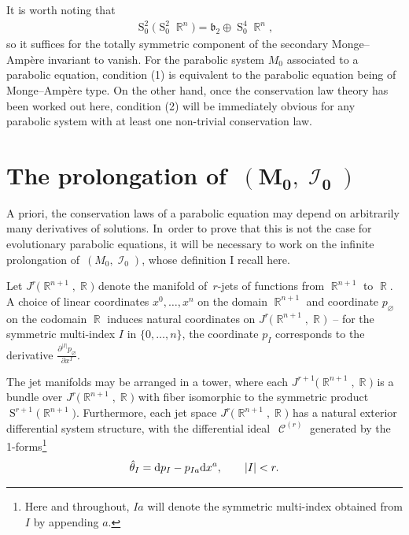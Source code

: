 \documentclass[pdftex]{sigma}
\DeclareMathOperator{\R}{\mathbb{R}}
\DeclareMathOperator{\Sym}{S}
\DeclareMathOperator{\I}{\mathcal{I}}
\DeclareMathOperator{\contact}{\mathcal{C}}
\renewcommand{\d}{{\rm d}}
\newcommand{\jet}[1]{J^{#1}\big(\R^{n+1},\R\big)}
\numberwithin{equation}{section}
\begin{document}
It is worth noting that
\begin{gather*}
\Sym^2_0 \big( \Sym^2_0 \R^n\big) = \mathfrak{b}_2 \oplus \Sym_0^4 \R^n ,
\end{gather*}
so it suffices for the totally symmetric component of the secondary Monge--Amp\`ere invariant to vanish.
For the parabolic system $M_0$ associated to a parabolic equation, condition (1) is equivalent to the parabolic equation being of Monge--Amp\`ere type. On the other hand, once the conservation law theory has been worked out here, condition (2) will be immediately obvious for any parabolic system with at least one non-trivial conservation law.

\section[The prolongation of (M0, I0)]{The prolongation of~$\boldsymbol{(M_0,\I_0)}$}\label{sec:prolongation of M_0}

A priori, the conservation laws of a parabolic equation may depend on arbitrarily many derivatives of solutions. In~order to prove that this is not the case for evolutionary parabolic equations, it will be necessary to work on the infinite prolongation of~$(M_0, \I_0)$, whose definition I recall here.

Let $\jet{r}$ denote the manifold of~$r$-jets of functions from $\R^{n+1}$ to $\R$. A choice of linear coordinates $x^0,\dots, x^n$ on the domain $\R^{n+1}$ and coordinate $p_\varnothing$ on the codomain $\R$ induces natural coordinates on $\jet{r}$~-- for the symmetric multi-index $I$ in $\{0 , \dots , n\}$, the coordinate $p_I$ corresponds to the derivative $\frac{\partial^{|I|}p_\varnothing}{\partial x^I}$.

The jet manifolds may be arranged in a tower, where each $\jet{r+1}$ is a bundle over $\jet{r}$ with fiber isomorphic to the symmetric product $\Sym^{r+1}\big(\R^{n+1}\big)$. Furthermore, each jet space $\jet{r}$ has a natural exterior differential system structure, with the differential ideal~$\contact^{(r)}$ generated by the 1-forms\footnote{Here and throughout, $Ia$ will denote the symmetric multi-index obtained from $I$ by appending $a$.}
\begin{gather*}
\hat\theta_I = \d p_I - p_{Ia}\d x^a, \qquad |I| < r .
\end{gather*}
\end{document}
